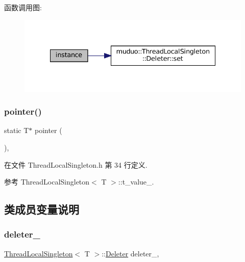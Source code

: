 函数调用图\+:
\nopagebreak
\begin{figure}[H]
\begin{center}
\leavevmode
\includegraphics[width=335pt]{classmuduo_1_1ThreadLocalSingleton_a359703743cd890f1e3df60b6b06a5724_cgraph}
\end{center}
\end{figure}
\mbox{\label{classmuduo_1_1ThreadLocalSingleton_aab6f1d4429cd39922b611fbc820bcb7b}} 
\subsubsection{\texorpdfstring{pointer()}{pointer()}}
{\footnotesize\ttfamily static T$\ast$ pointer (\begin{DoxyParamCaption}{ }\end{DoxyParamCaption})\hspace{0.3cm}{\ttfamily [inline]}, {\ttfamily [static]}}



在文件 Thread\+Local\+Singleton.\+h 第 34 行定义.



参考 Thread\+Local\+Singleton$<$ T $>$\+::t\+\_\+value\+\_\+.



\subsection{类成员变量说明}
\mbox{\label{classmuduo_1_1ThreadLocalSingleton_a25e20990a9a304c1e8634d4ae1604dd0}} 
\subsubsection{\texorpdfstring{deleter\+\_\+}{deleter\_}}
{\footnotesize\ttfamily \hyperlink{classmuduo_1_1ThreadLocalSingleton}{Thread\+Local\+Singleton}$<$ T $>$\+::\hyperlink{classmuduo_1_1ThreadLocalSingleton_1_1Deleter}{Deleter} deleter\+\_\+\hspace{0.3cm}{\ttfamily [static]}, {\ttfamily [private]}}



